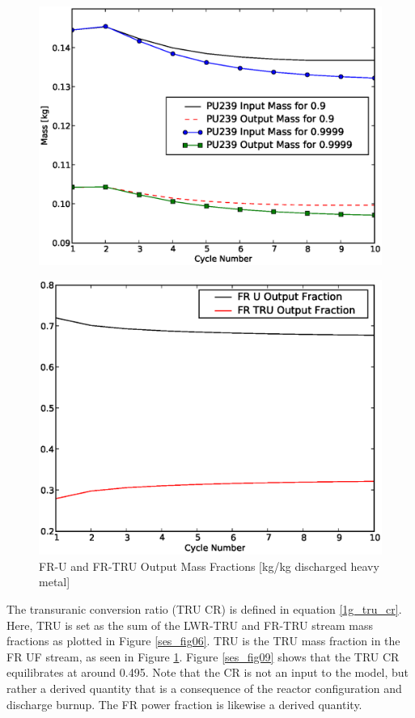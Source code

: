\begin{figure}[htbp]
\begin{center}
\includegraphics[scale=0.3]{se_sensitivity/figs/PU239InOutSepEff.eps}
\end{center}
\end{figure}


\begin{figure}[htbp]
\caption{FR-U and FR-TRU Output Mass Fractions [kg/kg discharged heavy metal]}
\label{ses_fig08}
\begin{center}
\includegraphics[scale=0.5]{se_sensitivity/figs/FRfracOut.eps}
\end{center}
\end{figure}

The transuranic conversion ratio (TRU CR) is defined in equation \ref{1g_tru_cr}.
Here, TRU is set as the sum of the LWR-TRU and FR-TRU stream mass
fractions as plotted in Figure \ref{ses_fig06}.  TRU is the TRU 
mass fraction in the FR UF stream, as seen in Figure \ref{ses_fig08}.  
Figure \ref{ses_fig09} shows that the TRU 
CR equilibrates at around 0.495.  Note that the CR is not an input to the model, but rather a
derived quantity that is a consequence of the reactor configuration and
discharge burnup.  The FR power fraction is likewise a derived quantity.

